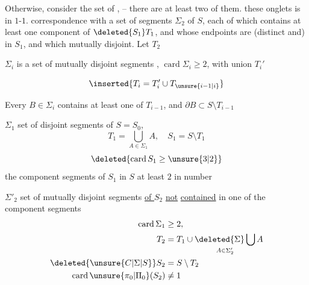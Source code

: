 Otherwise, consider the set of ,  -- there are at least two of them.  these onglets is in $1$-$1$. correspondence with a set of \unsure{(}segments $\Sigma_2$ of $S$, each of which contains at least one component of $\deleted{S_1}T_1$, and whose endpoints are (distinct and) in $S_1$, and which  mutually disjoint. Let $T_2$


$\Sigma_i$ is a set of mutually disjoint segments , $\operatorname{card}\Sigma_i\geq 2$,  with union $T_i'$ 

\reversemarginpar{}
\[\inserted{T_i=T_i'\cup T_{\unsure{i-1|i}}}\]
\noindent\llap{\rule[-2\baselineskip]{.4pt}{3\baselineskip}\hspace{.4em}}

Every $B\in\Sigma_i$ contains at least one   of $T_{i-1}$, and $\partial B\subset S\setminus T_{i-1}$ \normalmarginpar

\noindent\begin{minipage}[t]{.46\linewidth}
$\Sigma_1$ set of  disjoint segments of $S=S_0$,  
\[T_1=\bigcup_{A\in\Sigma_1} A,\quad S_1=S\setminus T_1\]
\[\deleted{\operatorname{card}S_1\geq\unsure{3|2}}\]
the component segments of $S_1$ in $S$ at least $2$ in number
\end{minipage}\hfill\begin{minipage}[t]{.51\linewidth}
$\Sigma'_2$ set of mutually disjoint segments \uline{of $S_2$} \uline{not} \uline{contained} in one of the component segments
\[\begin{aligned}\operatorname{card}\Sigma_1&\geq 2,\\
T_2&=T_1\cup\mathop{\deleted{\Sigma}\bigcup}\limits_{A\in\Sigma'_2} A\\
\deleted{\unsure{C|\Sigma|S}}S_2&=S\setminus T_2\\
\operatorname{card}\unsure{\pi_0|\Pi_0}(S_2)&\ne 1
\end{aligned}\]
\end{minipage}
